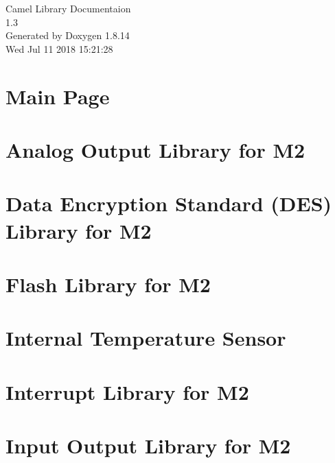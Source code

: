 \documentclass[twoside]{article}
\newcommand{\+}{\discretionary{\mbox{\scriptsize$\hookleftarrow$}}{}{}}
\begin{document}
\hypersetup{pageanchor=false,
             bookmarksnumbered=true,
             pdfencoding=unicode
            }
\begin{titlepage}
\vspace*{7cm}
\begin{center}%
{\Large Camel Library Documentaion \\[1ex]\large 1.\+3 }\\
\vspace*{1cm}
{\large Generated by Doxygen 1.8.14}\\
\vspace*{0.5cm}
{\small Wed Jul 11 2018 15:21:28}\\
\end{center}
\end{titlepage}
\tableofcontents
{}
\hypersetup{pageanchor=true}

\section{Main Page}
\label{index}\hypertarget{index}{}
\section{Analog Output Library for M2}
\label{a00139}

\section{Data Encryption Standard (D\+ES) Library for M2}
\label{a00140}

\section{Flash Library for M2}
\label{a00141}

\section{Internal Temperature Sensor}
\label{a00142}

\section{Interrupt Library for M2}
\label{a00143}

\section{Input Output Library for M2}
\label{a00144}

\end{document}
